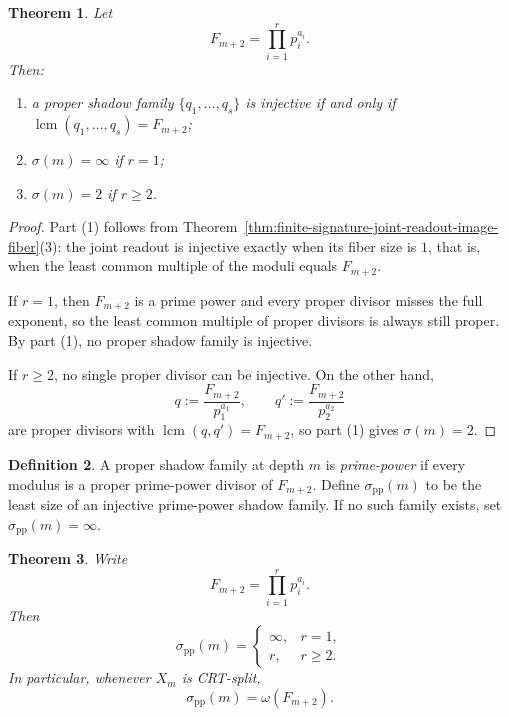 \documentclass[11pt,letterpaper]{article}
\numberwithin{equation}{section}
\theoremstyle{plain}
\newtheorem{theorem}{Theorem}[section]
\theoremstyle{definition}
\newtheorem{definition}[theorem]{Definition}
\theoremstyle{remark}
\DeclareMathOperator{\lcmop}{lcm}
\begin{document}
\begin{theorem}
\label{thm:proper-shadow-compressibility}
Let
\[
F_{m+2}=\prod_{i=1}^r p_i^{a_i}.
\]
Then:
\begin{enumerate}[label=(\arabic*)]
\item a proper shadow family $\{q_1,\dots,q_s\}$ is injective if and only if
$\lcmop(q_1,\dots,q_s)=F_{m+2}$;
\item $\sigma(m)=\infty$ if $r=1$;
\item $\sigma(m)=2$ if $r\ge 2$.
\end{enumerate}
\end{theorem}

\begin{proof}
Part (1) follows from
Theorem~\ref{thm:finite-signature-joint-readout-image-fiber}(3): the joint
readout is injective exactly when its fiber size is $1$, that is, when the
least common multiple of the moduli equals $F_{m+2}$.

If $r=1$, then $F_{m+2}$ is a prime power and every proper divisor misses the
full exponent, so the least common multiple of proper divisors is always still
proper. By part (1), no proper shadow family is injective.

If $r\ge 2$, no single proper divisor can be injective. On the other hand,
\[
q:=\frac{F_{m+2}}{p_1^{a_1}},
\qquad
q':=\frac{F_{m+2}}{p_2^{a_2}}
\]
are proper divisors with $\lcmop(q,q')=F_{m+2}$, so part (1) gives
$\sigma(m)=2$.
\end{proof}

\begin{definition}
\label{def:prime-power-shadow-complexity}
A proper shadow family at depth $m$ is \emph{prime-power} if every modulus is a
proper prime-power divisor of $F_{m+2}$. Define $\sigma_{\mathrm{pp}}(m)$ to be
the least size of an injective prime-power shadow family. If no such family
exists, set $\sigma_{\mathrm{pp}}(m)=\infty$.
\end{definition}

\begin{theorem}
\label{thm:prime-power-shadow-complexity}
Write
\[
F_{m+2}=\prod_{i=1}^r p_i^{a_i}.
\]
Then
\[
\sigma_{\mathrm{pp}}(m)=
\begin{cases}
\infty, & r=1,\\
r, & r\ge 2.
\end{cases}
\]
In particular, whenever $X_m$ is CRT-split,
\[
\sigma_{\mathrm{pp}}(m)=\omega(F_{m+2}).
\]
\end{theorem}
\end{document}
